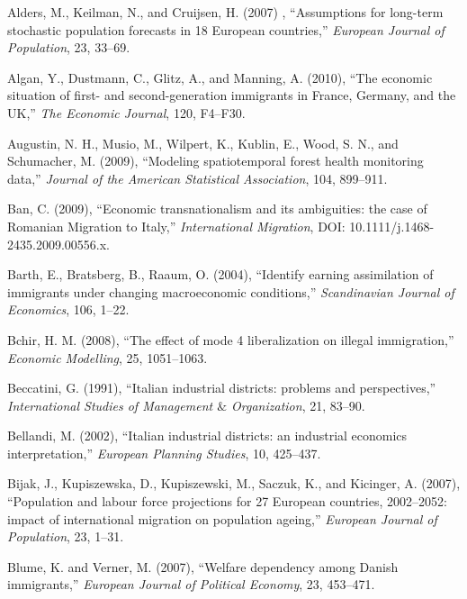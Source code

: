 \documentclass[10pt]{article}
\theoremstyle{definition}
\theoremstyle{plain}
\begin{document}
\begin{thebibliography}{99}

\bibitem{} Alders, M., Keilman, N., and Cruijsen, H. (2007) , ``Assumptions for long-term stochastic population forecasts in 18 European countries,'' \textit{European Journal of Population}, 23, 33--69.

\bibitem{} Algan, Y., Dustmann, C., Glitz, A., and Manning, A. (2010), ``The economic situation of first- and second-generation immigrants in France, Germany, and the UK,'' \textit{The Economic Journal}, 120, F4--F30.

\bibitem{} Augustin, N. H., Musio, M., Wilpert, K., Kublin, E., Wood, S. N., and Schumacher, M. (2009), ``Modeling spatiotemporal forest health monitoring data,'' \textit{Journal of the American Statistical Association}, 104, 899--911.

\bibitem{} Ban, C. (2009), ``Economic transnationalism and its ambiguities: the case of Romanian Migration to Italy,'' \textit{International Migration}, DOI: 10.1111/j.1468-2435.2009.00556.x.

\bibitem{} Barth, E., Bratsberg, B., Raaum, O. (2004), ``Identify earning assimilation of immigrants under changing macroeconomic conditions,'' \textit{Scandinavian Journal of Economics}, 106, 1--22.


\bibitem{} Bchir, H. M. (2008), ``The effect of mode 4 liberalization on illegal immigration,'' \textit{Economic Modelling}, 25, 1051--1063.

\bibitem{} Beccatini, G. (1991), ``Italian industrial districts: problems and perspectives,'' \textit{International Studies of Management $\&$ Organization}, 21, 83--90.

\bibitem{} Bellandi, M. (2002), ``Italian industrial districts: an industrial economics interpretation,'' \textit{European Planning Studies}, 10, 425--437.

\bibitem{} Bijak, J., Kupiszewska, D., Kupiszewski, M., Saczuk, K., and Kicinger, A. (2007), ``Population and labour force projections for 27 European countries, 2002--2052: impact of international migration on population ageing,'' \textit{European Journal of Population}, 23, 1--31.

\bibitem{} Blume, K. and Verner, M. (2007), ``Welfare dependency among Danish immigrants,'' \textit{European Journal of Political Economy}, 23, 453--471.


\end{thebibliography}
\end{document}
